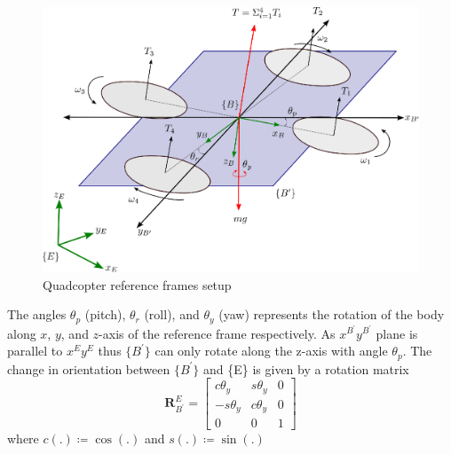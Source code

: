 \documentclass[letterpaper, 10 pt, conference]{ieeeconf}
\begin{document}
\begin{figure}[!ht]
    \centering
    \includegraphics[scale=0.40]{Quadcopter.eps}
    \caption{Quadcopter reference frames setup}
    \label{Fig: Quad Dynamics}
\end{figure}
The angles $\theta_{p}$ (pitch), $\theta_{r}$ (roll), and $\theta_{y}$ (yaw) represents the rotation of the body along $x$, $y$, and $z$-axis of the reference frame respectively. As $x^{B^{\prime}}y^{B^{\prime}}$ plane is parallel to $x^{E}y^{E}$ thus $\{B^{\prime}\}$ can only rotate along the z-axis with angle $\theta_{p}$. The change in orientation between $\{B^{\prime}\}$ and \{E\} is given by a rotation matrix
\begin{equation*}
    \mathbf{R}_{B^{\prime}}^{E}=\begin{bmatrix}
        c \theta_{y}  & s \theta_{y} & 0 \\
        -s \theta_{y} & c \theta_{y} & 0 \\
        0             & 0            & 1
    \end{bmatrix}
\end{equation*}
where $ c(.) \coloneqq \cos{(.)} $ and $ s(.) \coloneqq \sin{(.)}$
\end{document}
